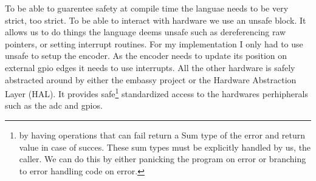 \documentclass[lang=en, hanging-titles=true]{skrapport}
\begin{document}
To be able to guarentee safety at compile time the languae needs to be very strict, too strict. To be able to interact with hardware we use an unsafe block. It allows us to do things the language deems unsafe such as dereferencing raw pointers, or setting interrupt routines. For my implementation I only had to use unsafe to setup the encoder. As the encoder needs to update its position on external gpio edges it needs to use interrupts. All the other hardware is safely abstracted around by either the embassy project\cite{embassy} or the Hardware Abstraction Layer (\textsc{HAL}). It provides safe\footnote{by having operations that can fail return a Sum type of the error and return value in case of succes. These sum types must be explicitly handled by us, the caller. We can do this by either panicking the program on error or branching to error handling code on error.} standardized access to the hardwares perhipherals such as the adc and gpios.
\end{document}
